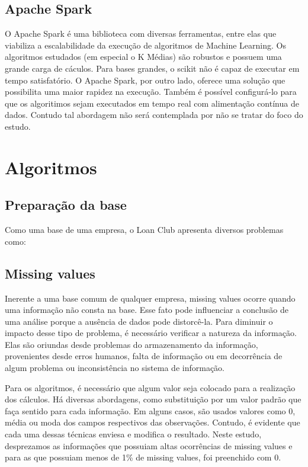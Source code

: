 \subsection{Apache Spark}

O Apache Spark é uma biblioteca com diversas ferramentas, entre elas que viabiliza a escalabilidade da execução de algoritmos de Machine Learning. Os algoritmos estudados (em especial o K Médias) são robustos e possuem uma grande carga de cáculos. Para bases grandes, o scikit não é capaz de executar em tempo satisfatório. O Apache Spark, por outro lado, oferece uma solução que possibilita uma maior rapidez na execução. Também é possível configurá-lo para que os algoritimos sejam executados em tempo real com alimentação contínua de dados. Contudo tal abordagem não será contemplada por não se tratar do foco do estudo.

\section{Algoritmos}

\subsection{Preparação da base}

Como uma base de uma empresa, o Loan Club apresenta diversos problemas como:

\subsection{Missing values}
Inerente a uma base comum de qualquer empresa, missing values ocorre quando uma informação não consta na base. Esse fato pode influenciar a conclusão de uma análise porque a ausência de dados pode distorcê-la. Para diminuir o impacto desse tipo de problema, é necessário verificar a natureza da informação. Elas são oriundas desde problemas do armazenamento da informação, provenientes desde erros humanos, falta de informação ou em decorrência de algum problema ou inconsistência no sistema de informação.

Para os algoritmos, é necessário que algum valor seja colocado para a realização dos cálculos. Há diversas abordagens, como substituição por um valor padrão que faça sentido para cada informação. Em alguns casos, são usados valores como 0, média ou moda dos campos respectivos das observações. Contudo, é evidente que cada uma dessas técnicas enviesa e modifica o resultado. Neste estudo, desprezamos as informações que possuiam altas ocorrências de missing values e para as que possuiam menos de 1\% de missing values, foi preenchido com 0. 

